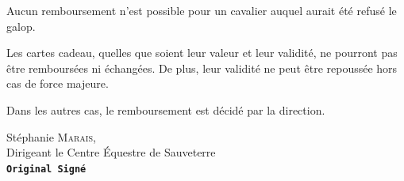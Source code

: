\documentclass[11pt,a4paper]{article}
\begin{document}
      Aucun remboursement n'est possible pour un cavalier auquel aurait été refusé le galop.

      Les cartes cadeau, quelles que soient leur valeur et leur validité, ne pourront pas être remboursées ni échangées.
      De plus, leur validité ne peut être repoussée hors cas de force majeure.

      Dans les autres cas, le remboursement est décidé par la direction.


      \vspace{3cm}

      \hspace{.55\textwidth}
      \begin{minipage}{.4\textwidth}
         \begin{center}
            Stéphanie \textsc{Marais},\\
            Dirigeant le Centre Équestre de Sauveterre\\
            \textbf{\texttt{Original Signé}}
         \end{center}
      \end{minipage}
\end{document}
